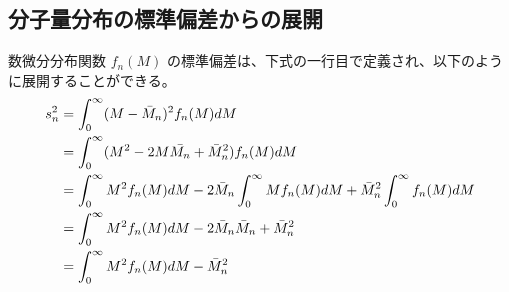 \documentclass[uplatex,dvipdfmx,a4paper,11pt, titlepage]{jsarticle}
\newcommand{\diff}{\mathrm d}
\newcommand{\difd}[2]{\dfrac{\diff #1}{\diff #2}}
\begin{document}
\begin{appendix}
%
%
%
\newpage
\section{分子量分布の標準偏差からの展開}
\label{sec:MwMn}

数微分分布関数 $f_n(M)$ の標準偏差は、下式の一行目で定義され、以下のように展開することができる。
\begin{align}
s_n^2
	&= \displaystyle \int_0^{\infty}(M - \bar{M}_n)^2 f_n(M) dM \notag \\
	&= \displaystyle \int_0^{\infty}(M^2 - 2M \bar{M_n} + \bar{M}_n^2) f_n(M) dM \notag \\
	&= \displaystyle \int_0^{\infty} M^2 f_n(M) dM - 2 \bar{M}_n \displaystyle \int_0^{\infty} M f_n(M) dM + \bar{M}_n^2 \displaystyle \int_0^{\infty} f_n(M) dM \notag \\
	&= \displaystyle \int_0^{\infty} M^2 f_n(M) dM - 2 \bar{M}_n \bar{M}_n + \bar{M}_n^2  \notag \\
	&= \displaystyle \int_0^{\infty} M^2 f_n(M) dM - \bar{M}_n^2
\end{align}


\end{appendix}
\end{document}
